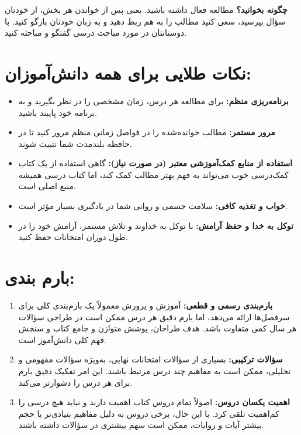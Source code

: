 \documentclass[11pt,a4paper]{article}
\begin{document}
\textbf{چگونه بخوانید؟} مطالعه فعال داشته باشید. یعنی پس از خواندن هر بخش، از خودتان سؤال بپرسید، سعی کنید مطالب را به هم ربط دهید و به زبان خودتان بازگو کنید. با دوستانتان در مورد مباحث درسی گفتگو و مباحثه کنید.

\section*{نکات طلایی برای همه دانش‌آموزان:}

\begin{itemize}
    \item \textbf{برنامه‌ریزی منظم:} برای مطالعه هر درس، زمان مشخصی را در نظر بگیرید و به برنامه خود پایبند باشید.
    \item \textbf{مرور مستمر:} مطالب خوانده‌شده را در فواصل زمانی منظم مرور کنید تا در حافظه بلندمدت شما تثبیت شوند.
    \item \textbf{استفاده از منابع کمک‌آموزشی معتبر (در صورت نیاز):} گاهی استفاده از یک کتاب کمک‌درسی خوب می‌تواند به فهم بهتر مطالب کمک کند، اما کتاب درسی همیشه منبع اصلی است.
    \item \textbf{خواب و تغذیه کافی:} سلامت جسمی و روانی شما در یادگیری بسیار مؤثر است.
    \item \textbf{توکل به خدا و حفظ آرامش:} با توکل به خداوند و تلاش مستمر، آرامش خود را در طول دوران امتحانات حفظ کنید.
\end{itemize}

\section*{بارم بندی:}

\begin{enumerate}
    \item \textbf{بارم‌بندی رسمی و قطعی:} آموزش و پرورش معمولاً یک بارم‌بندی کلی برای سرفصل‌ها ارائه می‌دهد، اما بارم دقیق هر درس ممکن است در طراحی سؤالات هر سال کمی متفاوت باشد. هدف طراحان، پوشش متوازن و جامع کتاب و سنجش فهم کلی دانش‌آموز است.
    \item \textbf{سؤالات ترکیبی:} بسیاری از سؤالات امتحانات نهایی، به‌ویژه سؤالات مفهومی و تحلیلی، ممکن است به مفاهیم چند درس مرتبط باشند. این امر تفکیک دقیق بارم برای هر درس را دشوارتر می‌کند.
    \item \textbf{اهمیت یکسان دروس:} اصولاً تمام دروس کتاب اهمیت دارند و نباید هیچ درسی را کم‌اهمیت تلقی کرد. با این حال، برخی دروس به دلیل مفاهیم بنیادی‌تر یا حجم بیشتر آیات و روایات، ممکن است سهم بیشتری در سؤالات داشته باشند.
\end{enumerate}
\end{document}
